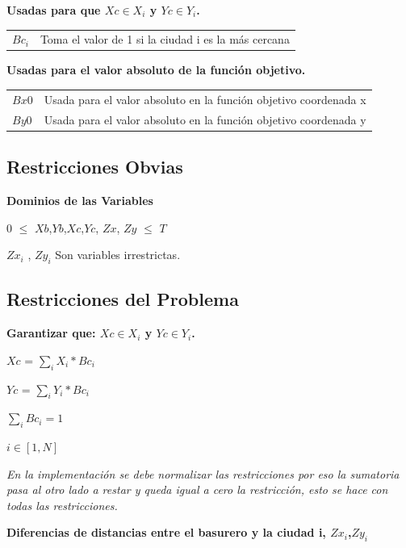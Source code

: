 \documentclass[10pt]{article}
\begin{document}
\textbf{Usadas para  que  $Xc \in X_i$ y $Yc \in Y_i$.}\\

\begin{tabular}{l l }
$Bc_i$ & Toma el valor de 1 si la ciudad i es la m\'as cercana \\
\end{tabular}\bigskip


\textbf{Usadas para  el valor absoluto de la funci\'on objetivo.}\\


\begin{tabular}{l l }
$Bx0$ &   Usada para el valor absoluto en la función objetivo coordenada x \\
$By0$ &   Usada para el valor absoluto en la función objetivo coordenada y \\
\end{tabular}\bigskip



\subsection{Restricciones Obvias}
\textbf{Dominios de las Variables}\\

\begin{center}
 $0$ $\leq $ $Xb$,$Yb$,$Xc$,$Yc$, $Zx$, $Zy$  $\leq $ $T$
 
 $Zx_i$ , $Zy_i$ Son variables irrestrictas.
\end{center}

\subsection{Restricciones del Problema}
\textbf{Garantizar que:  $Xc \in X_i$ y $Yc \in Y_i$. }\\

\begin{center}
$Xc$ = $\sum_i X_i * Bc_i$

$Yc$ = $\sum_i Y_i * Bc_i$

$\sum_i Bc_i = 1$

$i \in [1,N]$

 \emph{En la implementación se debe normalizar las restricciones por eso la sumatoria pasa al otro lado a restar y queda igual a cero la restricci\'on, esto se hace con todas las restricciones.}

\end{center}


\textbf{Diferencias de distancias entre el basurero y la ciudad i, $Zx_i$,$Zy_i$ }\\
\end{document}
